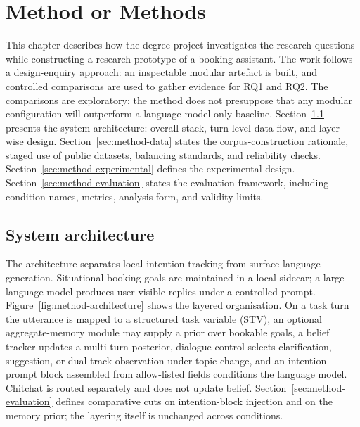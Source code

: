 
\chapter{Method or Methods}
\label{ch:methods}

This chapter describes how the degree project investigates the research questions while constructing a research prototype of a booking assistant.
The work follows a design-enquiry approach: an inspectable modular artefact is built, and controlled comparisons are used to gather evidence for RQ1 and RQ2.
The comparisons are exploratory; the method does not presuppose that any modular configuration will outperform a language-model-only baseline.
Section~\ref{sec:method-architecture} presents the system architecture: overall stack, turn-level data flow, and layer-wise design.
Section~\ref{sec:method-data} states the corpus-construction rationale, staged use of public datasets, balancing standards, and reliability checks.
Section~\ref{sec:method-experimental} defines the experimental design.
Section~\ref{sec:method-evaluation} states the evaluation framework, including condition names, metrics, analysis form, and validity limits.

\section{System architecture}
\label{sec:method-architecture}

The architecture separates local intention tracking from surface language generation.
Situational booking goals are maintained in a local sidecar; a large language model produces user-visible replies under a controlled prompt.
Figure~\ref{fig:method-architecture} shows the layered organisation.
On a task turn the utterance is mapped to a structured task variable (STV), an optional aggregate-memory module may supply a prior over bookable goals, a belief tracker updates a multi-turn posterior, dialogue control selects clarification, suggestion, or dual-track observation under topic change, and an intention prompt block assembled from allow-listed fields conditions the language model.
Chitchat is routed separately and does not update belief.
Section~\ref{sec:method-evaluation} defines comparative cuts on intention-block injection and on the memory prior; the layering itself is unchanged across conditions.

